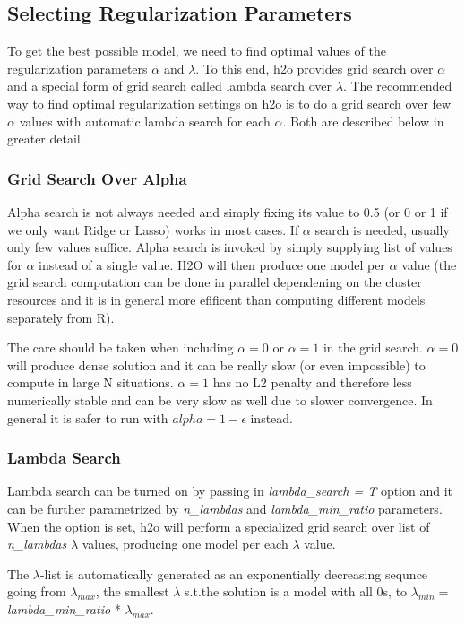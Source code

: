 \documentclass[11pt]{article}
\begin{document}
\subsection{Selecting Regularization Parameters}
To get the best possible model, we need to find optimal values of the regularization parameters $\alpha$ and $\lambda$. 
To this end, h2o provides grid search over $\alpha$ and a special form of grid search called lambda search over $\lambda$. The recommended way to find optimal regularization settings on h2o is to do a grid search over few $\alpha$ values with automatic lambda search for each $\alpha$. Both are described below in greater detail. 
\subsubsection{Grid Search Over Alpha}
Alpha search is not always needed and simply fixing its value to 0.5 (or 0 or 1 if we only want Ridge or Lasso) works in most cases. If $\alpha$ search is needed, usually only few values suffice. Alpha search is invoked by simply supplying list of values for $\alpha$ instead of a single value. H2O will then produce one model per $\alpha$ value (the grid search computation can be done in parallel dependening on the cluster resources and it is in general more efificent than computing different models separately from R). 

The care should be taken when including $\alpha=0$ or $\alpha=1$ in the grid search. $\alpha=0$ will produce dense solution and it can be really slow (or even impossible) to compute in large N situations. $\alpha=1$ has no L2 penalty and therefore less numerically stable and can be very slow as well due to slower convergence. In general it is safer to run with $alpha=1-\epsilon$ instead.

\subsubsection{Lambda Search}
Lambda search can be turned on by passing in \textit{lambda\_search = T} option and it can be further parametrized by \textit{n\_lambdas} and \textit{lambda\_min\_ratio} parameters. When the option is set, h2o will perform a specialized grid search over list of \textit{n\_lambdas} $\lambda$ values, producing one model per each $\lambda$ value. 

The $\lambda$-list is automatically generated as an exponentially decreasing sequnce going from $\lambda_{max}$,
the smallest $\lambda$ s.t.the solution is a model with all 0s, to $\lambda_{min} = $ \textit{lambda\_min\_ratio} * $ \lambda_{max}$.
\end{document}

